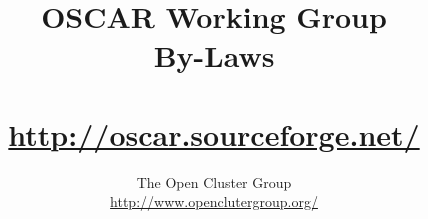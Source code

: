 %
%
%

\title{OSCAR Working Group \\
By-Laws \\
\ \\
\url{http://oscar.sourceforge.net/} \\
}

\author{The Open Cluster Group \\
\url{http://www.openclutergroup.org/}}
\maketitle
